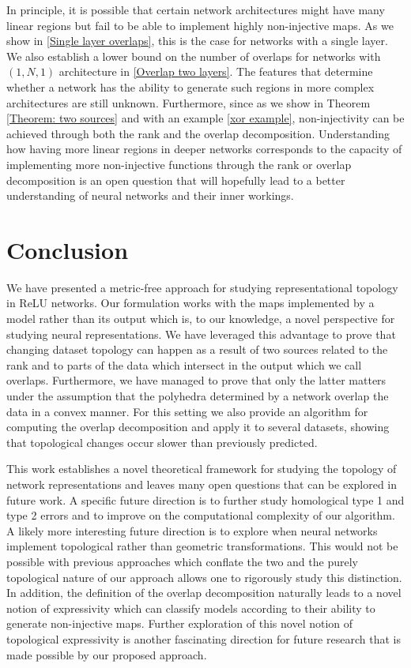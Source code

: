 \documentclass[10pt]{article} %
\theoremstyle{plain}
\theoremstyle{definition}
\theoremstyle{remark}
\begin{document}
In principle, it is possible that certain network architectures might have many linear regions but fail to be able to implement highly non-injective maps. As we show in \ref{Single layer overlaps}, this is the case for networks with a single layer. We also establish a lower bound on the number of overlaps for networks with $(1,N,1)$ architecture in \ref{Overlap two layers}. The features that determine whether a network has the ability to generate such regions in more complex architectures are still unknown. Furthermore, since as we show in Theorem \ref{Theorem: two sources} and with an example \ref{xor example}, non-injectivity can be achieved through both the rank and the overlap decomposition. Understanding how having more linear regions in deeper networks corresponds to the capacity of implementing more non-injective functions through the rank or overlap decomposition is an open question that will hopefully lead to a better understanding of neural networks and their inner workings.

\section{Conclusion}
{We have presented a metric-free approach for studying representational topology in ReLU networks. Our formulation works with the maps implemented by a model rather than its output which is, to our knowledge, a novel perspective for studying neural representations. We have leveraged this advantage to prove that changing dataset topology can happen as a result of two sources related to the rank and to parts of the data which intersect in the output which we call overlaps. Furthermore, we have managed to prove that only the latter matters under the assumption that the polyhedra determined by a network overlap the data in a convex manner. For this setting we also provide an algorithm for computing the overlap decomposition and apply it to several datasets, showing that topological changes occur slower than previously predicted. }

{ This work establishes a novel theoretical framework for studying the topology of network representations and leaves many open questions that can be explored in future work. A specific future direction is to further study homological type 1 and type 2 errors and to improve on the computational complexity of our algorithm. A likely more interesting future direction is to explore when neural networks implement topological rather than geometric transformations. This would not be possible with previous approaches which conflate the two and the purely topological nature of our approach allows one to rigorously study this distinction. In addition, the definition of the overlap decomposition naturally leads to a novel notion of expressivity which can classify models according to their ability to generate non-injective maps. Further exploration of this novel notion of topological expressivity is another fascinating direction for future research that is made possible by our proposed approach.}
\end{document}
